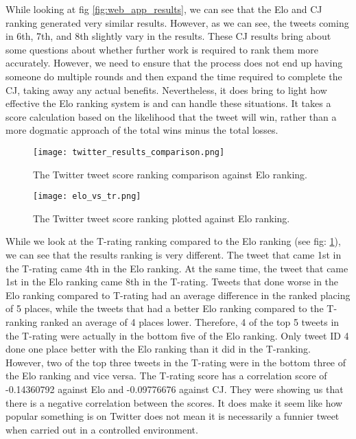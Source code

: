 	
	While looking at fig \ref{fig:web_app_results}, we can see that the Elo and CJ ranking generated very similar results. However, as we can see, the tweets coming in 6th, 7th, and 8th slightly vary in the results. These CJ results bring about some questions about whether further work is required to rank them more accurately. However, we need to ensure that the process does not end up having someone do multiple rounds and then expand the time required to complete the CJ, taking away any actual benefits. Nevertheless, it does bring to light how effective the Elo ranking system is and can handle these situations. It takes a score calculation based on the likelihood that the tweet will win, rather than a more dogmatic approach of the total wins minus the total losses.
	
	\begin{figure}[t]
		\centering
		\texttt{[image: twitter\_results\_comparison.png]}
		\caption{The Twitter tweet score ranking comparison against Elo ranking.}
		\label{fig:twitter_results_comparison}
		
	\end{figure}

	\begin{figure}[t]
		\centering
		\texttt{[image: elo\_vs\_tr.png]}
		\caption{The Twitter tweet score ranking plotted against Elo ranking.}
		\label{fig:elo_vs_tranking}
		
	\end{figure}

	While we look at the T-rating ranking compared to the Elo ranking (see fig: \ref{fig:twitter_results_comparison}), we can see that the results ranking is very different. The tweet that came 1st in the T-rating came 4th in the Elo ranking. At the same time, the tweet that came 1st in the Elo ranking came 8th in the T-rating.  Tweets that done worse in the Elo ranking compared to T-rating had an average difference in the ranked placing of 5 places, while the tweets that had a better Elo ranking compared to the T-ranking ranked an average of 4 places lower. Therefore, 4 of the top 5 tweets in the T-rating were actually in the bottom five of the Elo ranking. Only tweet ID 4 done one place better with the Elo ranking than it did in the T-ranking. However, two of the top three tweets in the T-rating were in the bottom three of the Elo ranking and vice versa. The T-rating score has a correlation score of -0.14360792 against Elo and -0.09776676 against CJ. They were showing us that there is a negative correlation between the scores. It does make it seem like how popular something is on Twitter does not mean it is necessarily a funnier tweet when carried out in a controlled environment.
	
